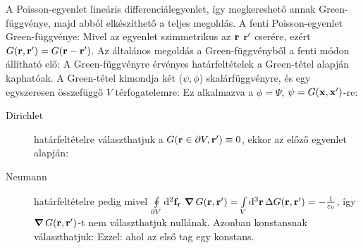    A Poisson-egyenlet lineáris differenciálegyenlet, így megkereshető annak Green-függvénye, majd abból elkészíthető a teljes megoldás. A fenti Poisson-egyenlet Green-függvénye:
   Mivel az egyenlet szimmetrikus az $\mathbf{r}$ $\mathbf{r}'$ cserére, ezért $G(\mathbf{r},\mathbf{r}')=G(\mathbf{r}-\mathbf{r}')$. Az általános megoldás a Green-függvényből a fenti módon állítható elő:
   A Green-függvényre érvényes határfeltételek a Green-tétel alapján kaphatóak. A Green-tétel kimondja két ($\psi,\phi$) skalárfüggvényre, és egy egyszeresen összefüggő $V$ térfogatelemre:
   Ez alkalmazva a $\phi=\Psi$, $\psi=G(\mathbf{x},\mathbf{x}')$-re:
   \begin{description}
    \item[Dirichlet] határfeltételre választhatjuk a $G(\mathbf{r}\in\partial V,\mathbf{r}')\equiv 0$, ekkor az előző egyenlet alapján:
    \item[Neumann] határfeltételre pedig mivel $\oint\limits_{\partial V}^{}\mathrm{d}^2\mathbf{f}_{\mathbf{r}}\,\mathop{\boldsymbol{\nabla}}\nolimits{G(\mathbf{r},\mathbf{r}')}=\int\limits_{V}^{}\mathrm{d}^3\mathbf{r}\, \Delta G(\mathbf{r},\mathbf{r}')=-\frac{1}{\varepsilon_0}$, így $\mathop{\boldsymbol{\nabla}}\nolimits{G(\mathbf{r},\mathbf{r}')}$-t nem választhatjuk nullának. Azonban konstansnak választhatjuk: 
    Ezzel: 
    ahol az első tag egy konstans. 
   \end{description}
   
